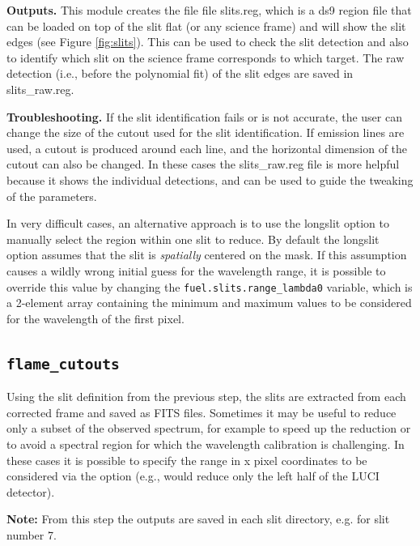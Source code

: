 \documentclass[a4paper]{article}
\begin{document}
\begin{sloppypar}
\medskip
\noindent
\textbf{Outputs.} This module creates the file file slits.reg, which is a ds9 region file that can be loaded on top of the slit flat (or any science frame) and will show the slit edges (see Figure \ref{fig:slits}). This can be used to check the slit detection and also to identify which slit on the science frame corresponds to which target. The raw detection (i.e., before the polynomial fit) of the slit edges are saved in slits\_raw.reg.

\medskip
\noindent
\textbf{Troubleshooting.} If the slit identification fails or is not accurate, the user can change the size of the cutout used for the slit identification. If emission lines are used, a cutout is produced around each line, and the horizontal dimension of the cutout can also be changed. In these cases the slits\_raw.reg file is more helpful because it shows the individual detections, and can be used to guide the tweaking of the parameters.

In very difficult cases, an alternative approach is to use the longslit option to manually select the region within one slit to reduce. By default the longslit option assumes that the slit is \emph{spatially} centered on the mask. If this assumption causes a wildly wrong initial guess for the wavelength range, it is possible to override this value by changing the \texttt{fuel.slits.range\_lambda0} variable, which is a 2-element array containing the minimum and maximum values to be considered for the wavelength of the first pixel.


\subsection{\texttt{flame\_cutouts}}

Using the slit definition from the previous step, the slits are extracted from each corrected frame and saved as FITS files. Sometimes it may be useful to reduce only a subset of the observed spectrum, for example to speed up the reduction or to avoid a spectral region for which the wavelength calibration is challenging. In these cases it is possible to specify the range in x pixel coordinates to be considered via the  option (e.g.,  would reduce only the left half of the LUCI detector).

\medskip
\noindent
\textbf{Note:} From this step the outputs are saved in each slit directory, e.g.  for slit number 7.


\end{sloppypar}
\end{document}
